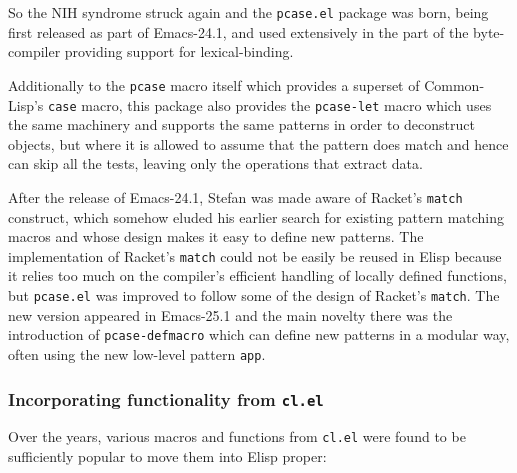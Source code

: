 \documentclass[format=acmsmall, review=false, screen=true]{acmart}
\newcommand \Elisp {Elisp}
\begin{document}
So the NIH syndrome struck again and the \texttt{pcase.el} package was born,
being first released as part of Emacs-24.1, and used extensively in the part
of the byte-compiler providing support for lexical-binding.

Additionally to the \texttt{pcase} macro itself which provides a superset of
Common-Lisp's \texttt{case} macro, this package also provides the
\texttt{pcase-let} macro which uses the same machinery and supports the same
patterns in order to deconstruct objects, but where it is allowed to assume
that the pattern does match and hence can skip all the tests, leaving only the
operations that extract data.

After the release of Emacs-24.1, Stefan was made aware of Racket's
\texttt{match} construct, which somehow eluded his earlier search for
existing pattern matching macros and whose design makes it easy to define
new patterns.  The implementation of Racket's \texttt{match} could not be
easily be reused in \Elisp{} because it relies too much on the compiler's
efficient handling of locally defined functions, but \texttt{pcase.el} was
improved to follow some of the design of Racket's \texttt{match}.
The new version appeared in Emacs-25.1 and the main novelty there was the
introduction of \texttt{pcase-defmacro} which can define new patterns
in a modular way, often using the new low-level pattern \texttt{app}.

\subsubsection{Incorporating functionality from \texttt{cl.el}}

Over the years, various macros and functions from \texttt{cl.el} were found
to be sufficiently popular to move them into \Elisp{} proper:
\end{document}
